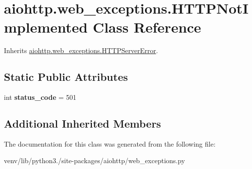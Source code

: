 \hypertarget{classaiohttp_1_1web__exceptions_1_1_h_t_t_p_not_implemented}{}\section{aiohttp.\+web\+\_\+exceptions.\+H\+T\+T\+P\+Not\+Implemented Class Reference}
\label{classaiohttp_1_1web__exceptions_1_1_h_t_t_p_not_implemented}


Inherits \hyperlink{classaiohttp_1_1web__exceptions_1_1_h_t_t_p_server_error}{aiohttp.\+web\+\_\+exceptions.\+H\+T\+T\+P\+Server\+Error}.

\subsection*{Static Public Attributes}
\begin{DoxyCompactItemize}
\item 
\mbox{\label{classaiohttp_1_1web__exceptions_1_1_h_t_t_p_not_implemented_ae35a1a3bf6660e57d472641c2bf25a6e}} 
int {\bfseries status\+\_\+code} = 501
\end{DoxyCompactItemize}
\subsection*{Additional Inherited Members}


The documentation for this class was generated from the following file\+:\begin{DoxyCompactItemize}
\item 
venv/lib/python3./site-\/packages/aiohttp/web\+\_\+exceptions.\+py\end{DoxyCompactItemize}
